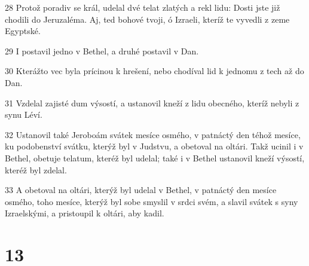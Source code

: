 \par 28 Protož poradiv se král, udelal dvé telat zlatých a rekl lidu: Dosti jste již chodili do Jeruzaléma. Aj, ted bohové tvoji, ó Izraeli, kteríž te vyvedli z zeme Egyptské.
\par 29 I postavil jedno v Bethel, a druhé postavil v Dan.
\par 30 Kterážto vec byla prícinou k hrešení, nebo chodíval lid k jednomu z tech až do Dan.
\par 31 Vzdelal zajisté dum výsostí, a ustanovil kneží z lidu obecného, kteríž nebyli z synu Léví.
\par 32 Ustanovil také Jeroboám svátek mesíce osmého, v patnáctý den téhož mesíce, ku podobenství svátku, kterýž byl v Judstvu, a obetoval na oltári. Takž ucinil i v Bethel, obetuje telatum, kteréž byl udelal; také i v Bethel ustanovil kneží výsostí, kteréž byl zdelal.
\par 33 A obetoval na oltári, kterýž byl udelal v Bethel, v patnáctý den mesíce osmého, toho mesíce, kterýž byl sobe smyslil v srdci svém, a slavil svátek s syny Izraelskými, a pristoupil k oltári, aby kadil.

\chapter{13}

